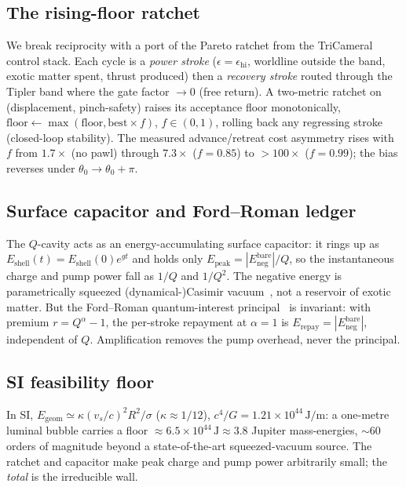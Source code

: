 \documentclass[11pt,a4paper]{article}
\begin{document}
\subsection{The rising-floor ratchet}
We break reciprocity with a port of the Pareto ratchet from the TriCameral control stack. Each cycle is a \emph{power stroke} ($\epsilon=\epsilon_{\mathrm{hi}}$, worldline outside the band, exotic matter spent, thrust produced) then a \emph{recovery stroke} routed through the Tipler band where the gate factor $\to0$ (free return). A two-metric ratchet on (displacement, pinch-safety) raises its acceptance floor monotonically, $\text{floor}\leftarrow\max(\text{floor},\text{best}\times f)$, $f\in(0,1)$, rolling back any regressing stroke (closed-loop stability). The measured advance/retreat cost asymmetry rises with $f$ from $1.7\times$ (no pawl) through $7.3\times$ ($f=0.85$) to $>\!100\times$ ($f=0.99$); the bias reverses under $\theta_{0}\to\theta_{0}+\pi$.

\subsection{Surface capacitor and Ford--Roman ledger}
The $Q$-cavity acts as an energy-accumulating surface capacitor: it rings up as $E_{\mathrm{shell}}(t)=E_{\mathrm{shell}}(0)e^{gt}$ and holds only $E_{\mathrm{peak}}=|E_{\mathrm{neg}}^{\mathrm{bare}}|/Q$, so the instantaneous charge and pump power fall as $1/Q$ and $1/Q^{2}$. The negative energy is parametrically squeezed (dynamical-)Casimir vacuum~\cite{Wilson2011}, not a reservoir of exotic matter. But the Ford--Roman quantum-interest principal~\cite{FordRoman1999} is invariant: with premium $r=Q^{\alpha}-1$, the per-stroke repayment at $\alpha=1$ is $E_{\mathrm{repay}}=|E_{\mathrm{neg}}^{\mathrm{bare}}|$, independent of $Q$. Amplification removes the pump overhead, never the principal.

\subsection{SI feasibility floor}
In SI, $E_{\mathrm{geom}}\simeq\kappa(v_{s}/c)^{2}R^{2}/\sigma$ ($\kappa\approx1/12$), $c^{4}/G=1.21\times10^{44}\,\mathrm{J/m}$: a one-metre luminal bubble carries a floor $\approx6.5\times10^{44}\,\mathrm{J}\approx3.8$ Jupiter mass-energies, $\sim\!60$ orders of magnitude beyond a state-of-the-art squeezed-vacuum source. The ratchet and capacitor make peak charge and pump power arbitrarily small; the \emph{total} is the irreducible wall.
\end{document}

